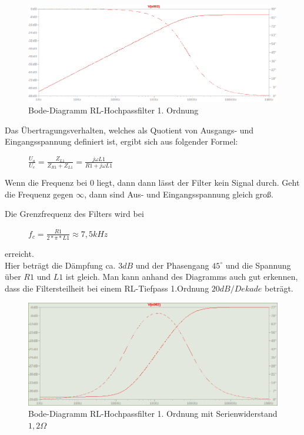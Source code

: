 \documentclass[12pt,a4paper,titlepage]{article}
\begin{document}
\begin{figure}[H]
  \centering
  \includegraphics[width=150mm]{bode_filter02.png}
  \caption{Bode-Diagramm RL-Hochpassfilter 1. Ordnung}
\end{figure}

\noindent Das Übertragungsverhalten, welches als Quotient von Ausgangs- und Eingangsspannung definiert ist, ergibt sich aus folgender Formel:
\begin{figure}[H]
  \centering
  $\frac{U_a}{U_e} = \frac{Z_{L1}}{Z_{R1}+Z_{L1}} = \frac{j\omega L1}{R1 + j\omega L1}$
\end{figure}
Wenn die Frequenz bei 0 liegt, dann dann lässt der Filter kein Signal durch. Geht die Frequenz gegen $\infty$, dann sind Aus- und Eingangsspannung gleich groß.

\noindent Die Grenzfrequenz des Filters wird bei
\begin{figure}[H]
  \centering
  $f_c = \frac{R1}{2*\pi*L1} \approx 7,5kHz$
\end{figure}
\noindent erreicht.\\
Hier beträgt die Dämpfung ca. $3dB$ und der Phasengang $45^{\circ}$ und die Spannung über $R1$ und $L1$ ist gleich. Man kann anhand des Diagramms auch gut erkennen, dass die Filtersteilheit bei einem RL-Tiefpass 1.Ordnung $20dB/Dekade$ beträgt.

\begin{figure}[H]
  \centering
  \includegraphics[width=150mm]{bode_filter02R.png}
  \caption{Bode-Diagramm RL-Hochpassfilter 1. Ordnung mit Serienwiderstand $1,2\Omega$}
\end{figure}
\end{document}
